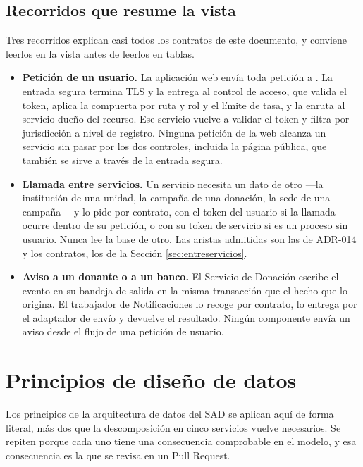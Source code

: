 \documentclass[11pt,a4paper]{article}
\begin{document}
\subsection{Recorridos que resume la vista}

Tres recorridos explican casi todos los contratos de este documento, y conviene leerlos en la vista antes de leerlos en tablas.

\begin{itemize}
\item \textbf{Petición de un usuario.} La aplicación web envía toda petición a . La entrada segura termina TLS y la entrega al control de acceso, que valida el token, aplica la compuerta por ruta y rol y el límite de tasa, y la enruta al servicio dueño del recurso. Ese servicio vuelve a validar el token y filtra por jurisdicción a nivel de registro. Ninguna petición de la web alcanza un servicio sin pasar por los dos controles, incluida la página pública, que también se sirve a través de la entrada segura.
\item \textbf{Llamada entre servicios.} Un servicio necesita un dato de otro ---la institución de una unidad, la campaña de una donación, la sede de una campaña--- y lo pide por contrato, con el token del usuario si la llamada ocurre dentro de su petición, o con su token de servicio si es un proceso sin usuario. Nunca lee la base de otro. Las aristas admitidas son las de ADR-014 y los contratos, los de la Sección \ref{sec:entreservicios}.
\item \textbf{Aviso a un donante o a un banco.} El Servicio de Donación escribe el evento en su bandeja de salida en la misma transacción que el hecho que lo origina. El trabajador de Notificaciones lo recoge por contrato, lo entrega por el adaptador de envío y devuelve el resultado. Ningún componente envía un aviso desde el flujo de una petición de usuario.
\end{itemize}

\section{Principios de diseño de datos}
\label{sec:principios}

Los principios de la arquitectura de datos del SAD se aplican aquí de forma literal, más dos que la descomposición en cinco servicios vuelve necesarios. Se repiten porque cada uno tiene una consecuencia comprobable en el modelo, y esa consecuencia es la que se revisa en un Pull Request.
\end{document}
